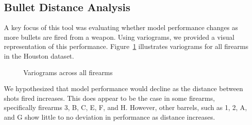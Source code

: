 \documentclass[
  number,
  preprint,
  5p,
  twocolumn]{elsarticle}
\begin{document}
\subsection{Bullet Distance Analysis}\label{bullet-distance-analysis}

A key focus of this tool was evaluating whether model performance
changes as more bullets are fired from a weapon. Using variograms, we
provided a visual representation of this performance.
Figure~\ref{fig-variograms} illustrates variograms for all firearms in
the Houston dataset.

\begin{figure}


\caption{\label{fig-variograms}Variograms across all firearms}

\end{figure}%

We hypothesized that model performance would decline as the distance
between shots fired increases. This does appear to be the case in some
firearms, specifically firearms 3, B, C, E, F, and H. However, other
barrels, such as 1, 2, A, and G show little to no deviation in
performance as distance increases.
\end{document}
